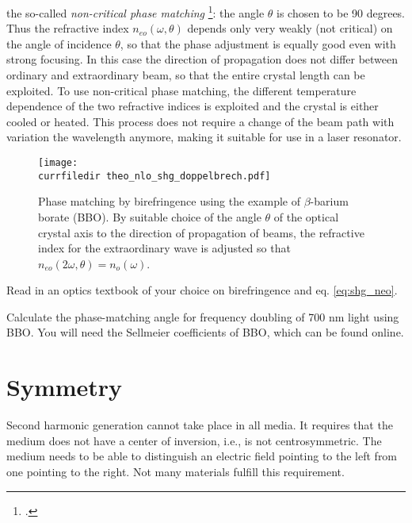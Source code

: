 the so-called \emph{non-critical phase matching}
\footcite{Demtroeder_laser,Hopf86}:
the angle $\theta$ is chosen to be 90 degrees. Thus the
refractive index $n_{eo}(\omega, \theta)$ depends only very weakly
(not critical) on the angle of incidence $\theta$, so that
the phase adjustment is equally good even with strong focusing. In this case
the direction of propagation does not differ between ordinary and
extraordinary beam, so that the entire crystal length
can be exploited. To use  non-critical
phase matching, the different
temperature dependence of the two refractive indices is exploited  and
the crystal is either cooled or heated. This process
does not require a change of the beam path with variation
the wavelength anymore, making it suitable for use in a
laser resonator.

\begin{figure}
\center
\texttt{[image: \\currfiledir theo\_nlo\_shg\_doppelbrech.pdf]}
\caption{Phase matching by birefringence using the example of
$\beta$-barium borate (BBO). By suitable choice of the angle
$\theta$ of the optical crystal axis to the direction of propagation of
beams, the refractive index for the extraordinary wave is adjusted
so that $n_{eo}(2 \omega, \theta) = n_o(\omega)$. }
\label{fig_shg_birefringence}

\end{figure}

\begin{questions}
\item Read in an optics textbook of your choice on birefringence and eq. \ref{eq:shg_neo}.

\item Calculate the phase-matching angle for frequency doubling of 700 nm light using BBO. You will need the Sellmeier coefficients of BBO, which can be found online.
\end{questions}


\section{Symmetry}

Second harmonic generation cannot take place in all media. It requires that the medium does not have a center of inversion, i.e., is not centrosymmetric. The medium needs to be able to distinguish an electric field pointing to the left from one pointing to the right. Not many materials fulfill this requirement.

